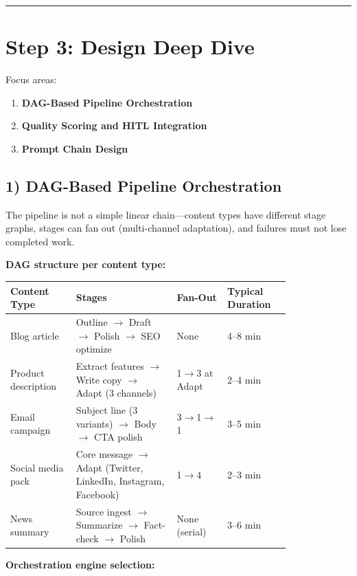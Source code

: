 \bigskip\hrule\bigskip

\section*{Step 3: Design Deep Dive}

Focus areas:

\begin{enumerate}
  \item \textbf{DAG-Based Pipeline Orchestration}
  \item \textbf{Quality Scoring and HITL Integration}
  \item \textbf{Prompt Chain Design}
\end{enumerate}

\subsection*{1) DAG-Based Pipeline Orchestration}

The pipeline is not a simple linear chain---content types have different stage graphs, stages can fan out (multi-channel adaptation), and failures must not lose completed work.

\textbf{DAG structure per content type:}

\begin{tabular}{|p{0.18\linewidth}|p{0.30\linewidth}|p{0.15\linewidth}|p{0.18\linewidth}|}
\hline
\textbf{Content Type} & \textbf{Stages} & \textbf{Fan-Out} & \textbf{Typical Duration} \\
\hline
Blog article & Outline $\rightarrow$ Draft $\rightarrow$ Polish $\rightarrow$ SEO optimize & None & 4--8 min \\
\hline
Product description & Extract features $\rightarrow$ Write copy $\rightarrow$ Adapt (3 channels) & 1$\rightarrow$3 at Adapt & 2--4 min \\
\hline
Email campaign & Subject line (3 variants) $\rightarrow$ Body $\rightarrow$ CTA polish & 3$\rightarrow$1$\rightarrow$1 & 3--5 min \\
\hline
Social media pack & Core message $\rightarrow$ Adapt (Twitter, LinkedIn, Instagram, Facebook) & 1$\rightarrow$4 & 2--3 min \\
\hline
News summary & Source ingest $\rightarrow$ Summarize $\rightarrow$ Fact-check $\rightarrow$ Polish & None (serial) & 3--6 min \\
\hline
\end{tabular}

\textbf{Orchestration engine selection:}

